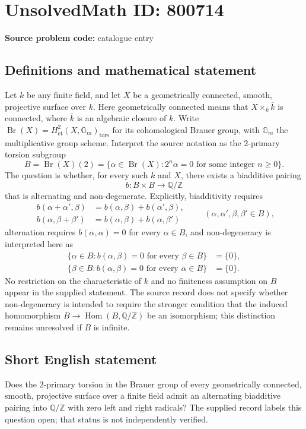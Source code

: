 \documentclass[11pt]{article}
\newcommand{\Z}{\mathbb{Z}}
\newcommand{\Q}{\mathbb{Q}}
\begin{document}
\section*{UnsolvedMath ID: 800714}
\textbf{Source problem code:} catalogue entry
\subsection{Definitions and mathematical statement}
Let \(k\) be any finite field, and let \(X\) be a geometrically connected, smooth, projective surface over \(k\). Here geometrically connected means that \(X\times_k\overline{k}\) is connected, where \(\overline{k}\) is an algebraic closure of \(k\). Write \(\operatorname{Br}(X)=H^2_{\mathrm{\acute{e}t}}(X,\mathbb G_m)_{\mathrm{tors}}\) for its cohomological Brauer group, with \(\mathbb G_m\) the multiplicative group scheme. Interpret the source notation as the \(2\)-primary torsion subgroup
\[
B=\operatorname{Br}(X)(2)=\{\alpha\in\operatorname{Br}(X):2^n\alpha=0\text{ for some integer }n\geq 0\}.
\]
The question is whether, for every such \(k\) and \(X\), there exists a biadditive pairing
\[
b:B\times B\longrightarrow\Q/\Z
\]
that is alternating and non-degenerate. Explicitly, biadditivity requires
\[
\begin{aligned}
b(\alpha+\alpha',\beta)&=b(\alpha,\beta)+b(\alpha',\beta),\\
b(\alpha,\beta+\beta')&=b(\alpha,\beta)+b(\alpha,\beta')
\end{aligned}
\qquad(\alpha,\alpha',\beta,\beta'\in B),
\]
alternation requires \(b(\alpha,\alpha)=0\) for every \(\alpha\in B\), and non-degeneracy is interpreted here as
\[
\begin{aligned}
\{\alpha\in B:b(\alpha,\beta)=0\text{ for every }\beta\in B\}&=\{0\},\\
\{\beta\in B:b(\alpha,\beta)=0\text{ for every }\alpha\in B\}&=\{0\}.
\end{aligned}
\]
No restriction on the characteristic of \(k\) and no finiteness assumption on \(B\) appear in the supplied statement. The source record does not specify whether non-degeneracy is intended to require the stronger condition that the induced homomorphism \(B\to\operatorname{Hom}(B,\Q/\Z)\) be an isomorphism; this distinction remains unresolved if \(B\) is infinite.
\subsection{Short English statement}
Does the \(2\)-primary torsion in the Brauer group of every geometrically connected, smooth, projective surface over a finite field admit an alternating biadditive pairing into \(\Q/\Z\) with zero left and right radicals? The supplied record labels this question open; that status is not independently verified.
\end{document}
